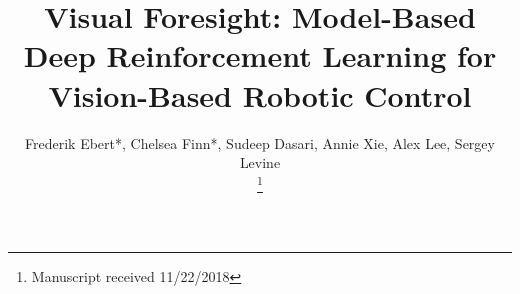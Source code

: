 \documentclass[10pt,journal,compsoc]{IEEEtran}
\begin{document}
%
\title{Visual Foresight: Model-Based Deep Reinforcement Learning for Vision-Based Robotic Control}
%
%

\author{Frederik Ebert*, Chelsea Finn*, Sudeep Dasari, Annie Xie, Alex Lee, Sergey Levine
        
\thanks{Manuscript received 11/22/2018}}
\end{document}

